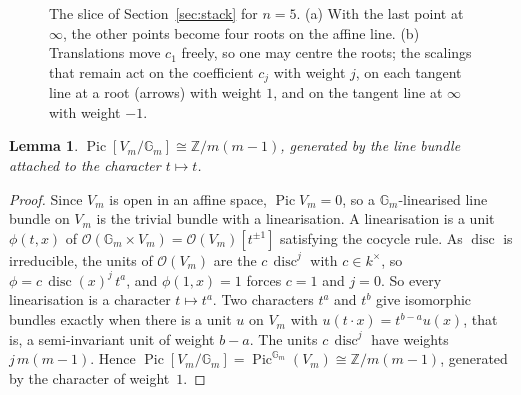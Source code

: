 \documentclass[11pt,a4paper]{amsart}
\newtheorem{lemma}[theorem]{Lemma}
\theoremstyle{remark}
\newcommand{\Pic}{\operatorname{Pic}}
\newcommand{\Gm}{\mathbb G_m}
\newcommand{\PP}{\mathbb P^1}
\newcommand{\disc}{\operatorname{disc}}
\begin{document}
\begin{figure}[ht]
\centering
{}
\caption{The slice of Section~\ref{sec:stack} for $n = 5$. (a) With the last point at $\infty$, the other points become four roots on the affine line. (b) Translations move $c_1$ freely, so one may centre the roots; the scalings that remain act on the coefficient $c_j$ with weight $j$, on each tangent line at a root (arrows) with weight $1$, and on the tangent line at $\infty$ with weight $-1$.}\label{fig:slice}
\end{figure}

\begin{lemma}\label{lem:pic}
$\Pic[V_m/\Gm] \cong \mathbb Z/m(m-1)$, generated by the line bundle attached to the character $t \mapsto t$.
\end{lemma}

\begin{proof}
Since $V_m$ is open in an affine space, $\Pic V_m = 0$, so a $\Gm$-linearised line bundle on $V_m$ is the trivial bundle with a linearisation. A linearisation is a unit $\phi(t, x)$ of $\mathcal O(\Gm \times V_m) = \mathcal O(V_m)[t^{\pm 1}]$ satisfying the cocycle rule. As $\disc$ is irreducible, the units of $\mathcal O(V_m)$ are the $c\,\disc^j$ with $c \in k^\times$, so $\phi = c\,\disc(x)^j\,t^a$, and $\phi(1, x) = 1$ forces $c = 1$ and $j = 0$. So every linearisation is a character $t \mapsto t^a$. Two characters $t^a$ and $t^b$ give isomorphic bundles exactly when there is a unit $u$ on $V_m$ with $u(t\cdot x) = t^{b-a} u(x)$, that is, a semi-invariant unit of weight $b - a$. The units $c\,\disc^j$ have weights $j\,m(m-1)$. Hence $\Pic[V_m/\Gm] = \Pic^{\Gm}(V_m) \cong \mathbb Z/m(m-1)$, generated by the character of weight~$1$.
\end{proof}
\end{document}
